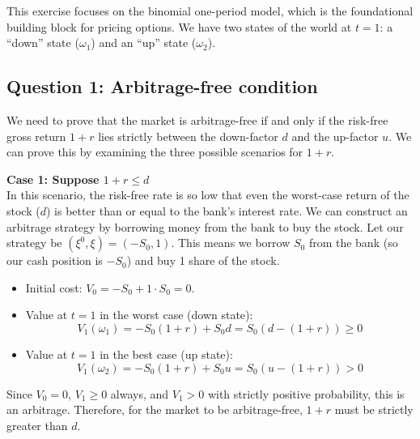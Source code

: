 This exercise focuses on the binomial one-period model, which is the foundational building block for pricing options. We have two states of the world at $t=1$: a ``down'' state ($\omega_1$) and an ``up'' state ($\omega_2$).

\subsection*{Question 1: Arbitrage-free condition}
We need to prove that the market is arbitrage-free if and only if the risk-free gross return $1+r$ lies strictly between the down-factor $d$ and the up-factor $u$. We can prove this by examining the three possible scenarios for $1+r$.

\textbf{Case 1: Suppose $1+r \le d$} \\
In this scenario, the risk-free rate is so low that even the worst-case return of the stock ($d$) is better than or equal to the bank's interest rate. 
We can construct an arbitrage strategy by borrowing money from the bank to buy the stock. 
Let our strategy be $(\xi^0, \xi) = (-S_0, 1)$. This means we borrow $S_0$ from the bank (so our cash position is $-S_0$) and buy 1 share of the stock.
\begin{itemize}
    \item Initial cost: $V_0 = -S_0 + 1 \cdot S_0 = 0$.
    \item Value at $t=1$ in the worst case (down state): 
    \begin{equation}
        V_1(\omega_1) = -S_0(1+r) + S_0 d = S_0(d - (1+r)) \ge 0
    \end{equation}
    \item Value at $t=1$ in the best case (up state):
    \begin{equation}
        V_1(\omega_2) = -S_0(1+r) + S_0 u = S_0(u - (1+r)) > 0
    \end{equation}
\end{itemize}
Since $V_0 = 0$, $V_1 \ge 0$ always, and $V_1 > 0$ with strictly positive probability, this is an arbitrage. Therefore, for the market to be arbitrage-free, $1+r$ must be strictly greater than $d$.

